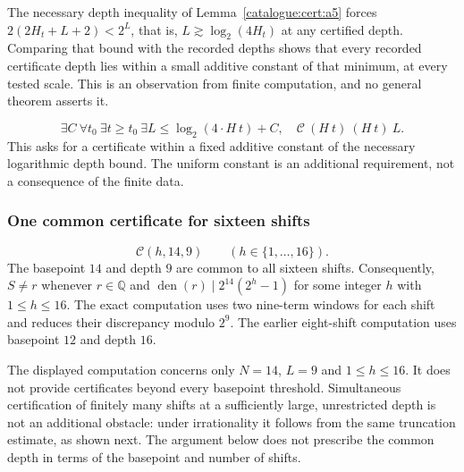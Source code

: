 \begin{rem}
The necessary depth inequality of Lemma~\ref{catalogue:cert:a5} forces
$2(2H_t{+}L{+}2)<2^L$, that is, $L \gtrsim \log_2(4H_t)$ at any certified
depth. Comparing that bound with the recorded depths shows that every
recorded certificate depth lies within a small additive constant of that
minimum, at every tested scale. This is an observation from finite
computation, and no general theorem asserts it.
\end{rem}

\begin{prop}\label{prop:sufficient-extension-2}
\[
  \exists C\ \forall t_0\ \exists t\ge t_0\ \exists L\le \log_2(4\cdot{H}\ t)+C,\quad
  \mathcal{C}\ ({H}\ t)\ ({H}\ t)\ L .
\]
This asks for a certificate within a fixed additive constant of the
necessary logarithmic depth bound. The uniform constant is an additional
requirement, not a consequence of the finite data.
\end{prop}

\subsubsection{One common certificate for sixteen shifts}

\begin{thm}\label{thm:one-common-certificate-sixteen-shifts}
\[
  \mathcal C(h,14,9)\qquad(h\in\{1,\ldots,16\}).
\]
The basepoint $14$ and depth $9$ are common to all sixteen shifts.
Consequently, $S\ne r$ whenever $r\in\mathbb Q$ and
$\operatorname{den}(r)\mid2^{14}(2^h-1)$ for some integer $h$ with
$1\le h\le16$. The exact computation uses two nine-term windows for
each shift and reduces their discrepancy modulo $2^9$. The earlier
eight-shift computation uses basepoint $12$ and depth $16$.
\end{thm}

\begin{rem}
The displayed computation concerns only $N=14$, $L=9$ and
$1\le h\le16$. It does not provide certificates beyond every basepoint
threshold. Simultaneous certification of finitely many shifts at a
sufficiently large, unrestricted depth is not an additional obstacle:
under irrationality it follows from the same truncation estimate, as
shown next. The argument below does not prescribe the common depth in terms of
the basepoint and number of shifts.
\end{rem}

